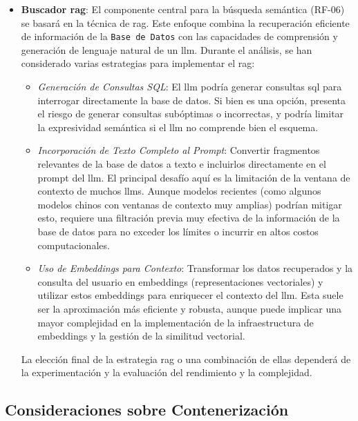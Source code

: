 \begin{itemize}
    \item \textbf{Buscador \gls{rag}}:
    El componente central para la búsqueda semántica (RF-06) se basará en la técnica de \gls{rag}. Este enfoque combina la recuperación eficiente de información de la \texttt{Base de Datos} con las capacidades de comprensión y generación de lenguaje natural de un \gls{llm}. Durante el análisis, se han considerado varias estrategias para implementar el \gls{rag}:
    \begin{itemize}
        \item \textit{Generación de Consultas SQL}: El \gls{llm} podría generar consultas \gls{sql} para interrogar directamente la base de datos. Si bien es una opción, presenta el riesgo de generar consultas subóptimas o incorrectas, y podría limitar la expresividad semántica si el \gls{llm} no comprende bien el esquema.
        \item \textit{Incorporación de Texto Completo al Prompt}: Convertir fragmentos relevantes de la base de datos a texto e incluirlos directamente en el prompt del \gls{llm}. El principal desafío aquí es la limitación de la ventana de contexto de muchos \glspl{llm}. Aunque modelos recientes (como algunos modelos chinos con ventanas de contexto muy amplias) podrían mitigar esto, requiere una filtración previa muy efectiva de la información de la base de datos para no exceder los límites o incurrir en altos costos computacionales.
        \item \textit{Uso de Embeddings para Contexto}: Transformar los datos recuperados y la consulta del usuario en embeddings (representaciones vectoriales) y utilizar estos embeddings para enriquecer el contexto del \gls{llm}. Esta suele ser la aproximación más eficiente y robusta, aunque puede implicar una mayor complejidad en la implementación de la infraestructura de embeddings y la gestión de la similitud vectorial.
    \end{itemize}
    La elección final de la estrategia \gls{rag} o una combinación de ellas dependerá de la experimentación y la evaluación del rendimiento y la complejidad.

\end{itemize}

\subsection{Consideraciones sobre Contenerización}
\label{subsec:docker_considerations}

